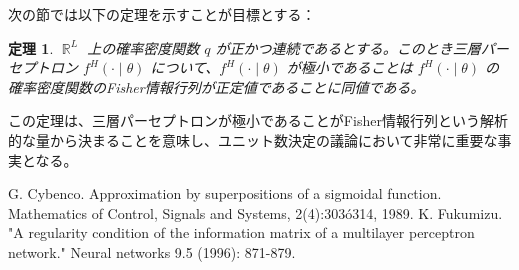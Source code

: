 \documentclass{jsarticle}
\DeclareMathOperator{\R}{\mathbb{R}}
\newtheorem{thm}{定理}[section]
\begin{document}
次の節では以下の定理を示すことが目標とする：
\begin{thm}
  $\R^L$ 上の確率密度関数 $q$ が正かつ連続であるとする。このとき三層パーセプトロン $f^H(\cdot\mid\theta)$ について、$f^H(\cdot\mid\theta)$ が極小であることは $f^H(\cdot\mid\theta)$ の確率密度関数のFisher情報行列が正定値であることに同値である。
\end{thm}
この定理は、三層パーセプトロンが極小であることがFisher情報行列という解析的な量から決まることを意味し、ユニット数決定の議論において非常に重要な事実となる。

\begin{thebibliography}{9}
   G. Cybenco. Approximation by superpositions of a sigmoidal function. Mathematics of Control, Signals and Systems, 2(4):303ó314, 1989.
   K. Fukumizu. "A regularity condition of the information matrix of a multilayer perceptron network." Neural networks 9.5 (1996): 871-879.
\end{thebibliography}
\end{document}
